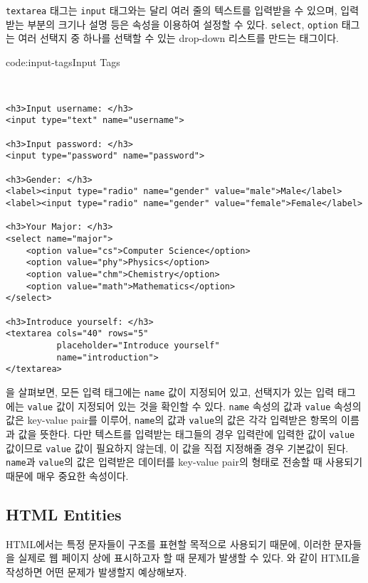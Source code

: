 \verb|textarea| 태그는 \verb|input| 태그와는 달리 여러 줄의 텍스트를 입력받을 수 있으며, 입력받는 부분의 크기나 설명 등은 속성을 이용하여 설정할 수 있다. \verb|select|, \verb|option| 태그는 여러 선택지 중 하나를 선택할 수 있는 drop-down 리스트를 만드는 태그이다. 

\begin{codeenv}{code:input-tags}{Input Tags}\begin{verbatim}


<h3>Input username: </h3>
<input type="text" name="username">

<h3>Input password: </h3>
<input type="password" name="password">

<h3>Gender: </h3>
<label><input type="radio" name="gender" value="male">Male</label>
<label><input type="radio" name="gender" value="female">Female</label>

<h3>Your Major: </h3>
<select name="major">
    <option value="cs">Computer Science</option>
    <option value="phy">Physics</option>
    <option value="chm">Chemistry</option>
    <option value="math">Mathematics</option>
</select>

<h3>Introduce yourself: </h3>
<textarea cols="40" rows="5"
          placeholder="Introduce yourself"
          name="introduction">
</textarea>
\end{verbatim}
\end{codeenv}

을 살펴보면, 모든 입력 태그에는 \verb|name| 값이 지정되어 있고, 선택지가 있는 입력 태그에는 \verb|value| 값이 지정되어 있는 것을 확인할 수 있다. \verb|name| 속성의 값과 \verb|value| 속성의 값은 key-value pair를 이루어, \verb|name|의 값과 \verb|value|의 값은 각각 입력받은 항목의 이름과 값을 뜻한다. 다만 텍스트를 입력받는 태그들의 경우 입력란에 입력한 값이 \verb|value| 값이므로 \verb|value| 값이 필요하지 않는데, 이 값을 직접 지정해줄 경우 기본값이 된다. \verb|name|과 \verb|value|의 값은 입력받은 데이터를 key-value pair의 형태로 전송할 때 사용되기 때문에 매우 중요한 속성이다.

\subsection*{HTML Entities}

HTML에서는 특정 문자들이 구조를 표현할 목적으로 사용되기 때문에, 이러한 문자들을 실제로 웹 페이지 상에 표시하고자 할 때 문제가 발생할 수 있다. 와 같이 HTML을 작성하면 어떤 문제가 발생할지 예상해보자. 

